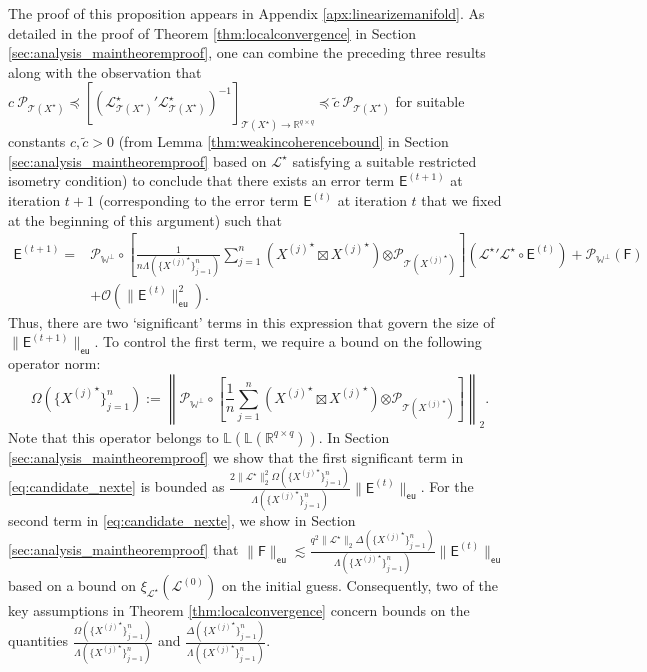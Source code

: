 \documentclass[11pt,letterpaper]{article}
\newcommand{\R}{\mathbb{R}}
\renewcommand{\L}{\mathcal{L}}
\newcommand{\botimes}{\boldsymbol \otimes}
\newcommand{\ct}{\mathcal{T}}
\newcommand{\cp}{\mathcal{P}}
\newcommand{\sfe}{\mathsf{E}}
\newcommand{\sff}{\mathsf{F}}
\newcommand{\eu}{\mathsf{eu}}
\begin{document}
The proof of this proposition appears in Appendix \ref{apx:linearizemanifold}.  As detailed in the proof of Theorem \ref{thm:localconvergence} in Section \ref{sec:analysis_maintheoremproof}, one can combine the preceding three results along with the observation that $c ~ \cp_{\ct(X^\star)} \preceq \left[\left({\L^\star_{\ct(X^\star)}}' \L^\star_{\ct(X^\star)}\right)^{-1} \right]_{\ct(X^\star) \rightarrow \R^{q \times q}} \preceq \tilde{c} ~ \cp_{\ct(X^\star)}$ for suitable constants $c,\tilde{c} > 0$ (from Lemma \ref{thm:weakincoherencebound} in Section \ref{sec:analysis_maintheoremproof} based on $\L^\star$ satisfying a suitable restricted isometry condition) to conclude that there exists an error term $\sfe^{(t+1)}$ at iteration $t+1$ (corresponding to the error term $\sfe^{(t)}$ at iteration $t$ that we fixed at the beginning of this argument) such that
\begin{equation} \label{eq:candidate_nexte}
\begin{aligned}
\sfe^{(t+1)} = & \cp_{\mathbb{W}^\perp} \circ \left[\frac{1}{n \Lambda\!(\{{X^{(j)}}^\star\}_{j=1}^n)} \sum_{j=1}^n \left({X^{(j)}}^\star \boxtimes {X^{(j)}}^\star \right) \botimes \cp_{\ct({X^{(j)}}^\star)} \right]({\L^\star}' \L^\star \circ \sfe^{(t)}) + \cp_{\mathbb{W}^\perp}(\sff) \\ &+ \mathcal{O}(\|\sfe^{(t)}\|_{\eu}^2).
\end{aligned}
\end{equation}
Thus, there are two `significant' terms in this expression that govern the size of $\|\sfe^{(t+1)}\|_{\eu}$.  To control the first term, we require a bound on the following operator norm:
\begin{equation} \label{eq:defn_omegaoperator}
\Omega(\{{X^{(j)}}^\star\}_{j=1}^n) := \left\|\cp_{\mathbb{W}^\perp} \circ \left[\frac{1}{n} \sum_{j=1}^n \left({X^{(j)}}^\star \boxtimes {X^{(j)}}^\star \right) \botimes \cp_{\ct({X^{(j)}}^\star)} \right] \right\|_2.
\end{equation}
Note that this operator belongs to $\mathbb{L}(\mathbb{L}(\R^{q \times q}))$.  In Section \ref{sec:analysis_maintheoremproof} we show that the first significant term in \eqref{eq:candidate_nexte} is bounded as $\frac{2 \|\L^\star\|_{2}^2 \Omega(\{{X^{(j)}}^\star\}_{j=1}^n)}{\Lambda(\{{X^{(j)}}^\star\}_{j=1}^n)} \|\sfe^{(t)}\|_{\eu}$.  For the second term in \eqref{eq:candidate_nexte}, we show in Section \ref{sec:analysis_maintheoremproof} that $\|\sff\|_{\eu} \lesssim \frac{q^2 \|\L^\star\|_{2} \Delta(\{{X^{(j)}}^\star\}_{j=1}^n)}{\Lambda(\{{X^{(j)}}^\star\}_{j=1}^n)} \|\sfe^{(t)}\|_{\eu}$ based on a bound on $\xi_{\L^\star}(\L^{(0)})$ on the initial guess.  Consequently, two of the key assumptions in Theorem \ref{thm:localconvergence} concern bounds on the quantities $\frac{\Omega(\{{X^{(j)}}^\star\}_{j=1}^n)} {\Lambda(\{{X^{(j)}}^\star\}_{j=1}^n)}$ and $\frac{\Delta(\{{X^{(j)}}^\star\}_{j=1}^n)} {\Lambda(\{{X^{(j)}}^\star\}_{j=1}^n)}$.
\end{document}
